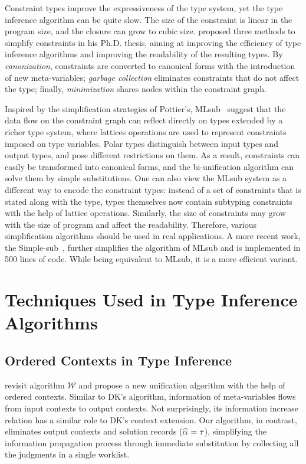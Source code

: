 Constraint types improve the expressiveness of the type system,
yet the type inference algorithm can be quite slow.
The size of the constraint is linear in the program size,
and the closure can grow to cubic size.
\citet{pottier1998phd} proposed three methods to simplify constraints in his Ph.D. thesis,
aiming at improving the efficiency of type inference algorithms and
improving the readability of the resulting types.
By \emph{canonization}, constraints are converted to canonical forms
with the introduction of new meta-variables;
\emph{garbage collection} eliminates constraints that do not affect the type;
finally, \emph{minimization} shares nodes within the constraint graph.

Inspired by the simplification strategies of Pottier's,
MLsub~\citep{mlsub} suggest that the data flow on the constraint graph
can reflect directly on types extended by a richer type system,
where lattices operations are used to represent constraints imposed on type variables.
Polar types distinguish between input types and output types,
and pose different restrictions on them.
As a result, constraints can easily be transformed into canonical forms,
and the bi-unification algorithm can solve them by simple substitutions.
One can also view the MLsub system as a different way to encode the constraint types:
instead of a set of constraints that is stated along with the type,
types themselves now contain subtyping constraints with the help of lattice operations.
Similarly, the size of constraints may grow with the size of program
and affect the readability.
Therefore, various simplification algorithms should be used in real applications.
A more recent work, the Simple-sub~\citep{Parreaux2020simple}, further simplifies
the algorithm of MLsub and is implemented in 500 lines of code.
While being equivalent to MLsub, it is a more efficient variant.

\section{Techniques Used in Type Inference Algorithms}

\subsection{Ordered Contexts in Type Inference}
\citet{gundry2010type} revisit algorithm $\mathcal{W}$ and
propose a new unification algorithm with the help of ordered contexts.
Similar to DK's algorithm, information of meta-variables flows from input contexts to output contexts.
Not surprisingly, its information increase relation has a similar role to DK's context extension.
Our algorithm, in contrast,
eliminates output contexts and solution records ($\al = \tau$),
simplifying the information propagation process through immediate substitution
by collecting all the judgments in a single worklist.

